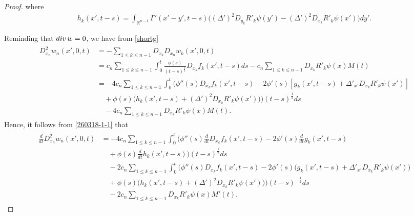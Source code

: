 \documentclass[10pt,a4paper]{amsart}
\newcommand{\De}{\Delta}
\newcommand{\Ga}{\Gamma}
\newcommand{\Rn}{{\mathbb R}^{n-1}}
\begin{document}
\begin{proof}
where 
\begin{align*}
h_k (x', t-s)  = \int_{\Rn} \Ga' (x'- y', t-s) \Big(  ( \De')^2  D_{y_k} R'_k \psi(y') -  ( \De')^2  D_{x_k}  R'_k \psi(x') \Big) dy'.
\end{align*}





 


 
Reminding that $ {\rm div} \, w =0$, we have  from \eqref{shortg}
\begin{align}\label{260318-1-1}
\begin{split}
D_{x_n}^2 w_n(x',  0, t) & =  -\sum_{1 \leq k \leq n-1} D_{x_k} D_{x_n} w_k (x', 0, t)\\
 & =   c_n \sum_{1 \leq k \leq n-1}\int_0^t  \frac{ \phi(s)}{(t-s)^\frac32}    D_{x_k}  f_k (x', t-s) ds    -c_n  \sum_{1 \leq k \leq n-1} D_{x_k}  R'_k \psi(x) M(t)\\
 & = -4  c_n  \sum_{1 \leq k \leq n-1} \int_0^t    \Big(  \phi'' (s)    D_{x_k}  f _k(x', t-s)  -  2\phi'  (s)   [g_k (x', t-s) +   \De'_{x'} D_{x_k} R'_k \psi(x') ] \\
& \quad    + \phi (s) \big(h_k (x', t-s)   + ( \De')^2 D_{x_k}  R'_k \psi(x')   \big) \Big)  (t-s)^{\frac12}   ds\\
 &  \quad    -4c_n  \sum_{1 \leq k \leq n-1} D_{x_k}  R'_k \psi(x) M(t).
 \end{split}
\end{align}
Hence,  it follows from \eqref{260318-1-1} that
\begin{align}\label{260318-1}
\begin{split}
\frac{d}{dt} D_{x_n}^2 w_n(x',  0, t) 
 & =  -4  c_n  \sum_{1 \leq k \leq n-1} \int_0^t    \Big(  \phi'' (s)     \frac{d}{dt}  D_{x_k}  f _k(x', t-s)  -  2\phi'  (s)   \frac{d}{dt}  g_k (x', t-s)  \\
& \quad    + \phi (s)  \frac{d}{dt}  h_k (x', t-s)   \Big)  (t-s)^{\frac12}   ds\\
&\quad   -2    c_n  \sum_{1 \leq k \leq n-1} \int_0^t    \Big(  \phi'' (s)    D_{x_k}  f _k(x', t-s)  -  2\phi'  (s)   \Big(g_k (x', t-s) +   \De'_{x'} D_{x_k} R'_k \psi(x') \Big) \\
& \quad    + \phi (s) \big(h_k (x', t-s)   + ( \De')^2 D_{x_k}  R'_k \psi(x')   \big) \Big)  (t-s)^{-\frac12}   ds\\
 &  \quad    -2c_n  \sum_{1 \leq k \leq n-1} D_{x_k}  R'_k \psi(x)M'(t).
 \end{split}
\end{align}
 

\end{proof}
\end{document}
